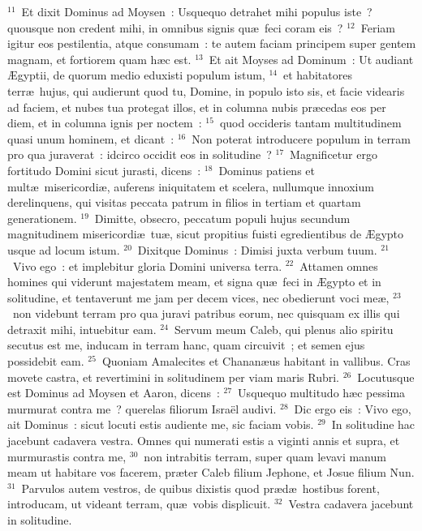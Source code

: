${}^{11}$~Et dixit Dominus ad Moysen~: Usquequo detrahet mihi populus iste~? quousque non credent mihi, in omnibus signis qu\ae\ feci coram eis~?
${}^{12}$~Feriam igitur eos pestilentia, atque consumam~: te autem faciam principem super gentem magnam, et fortiorem quam h\ae c est.
${}^{13}$~Et ait Moyses ad Dominum~: Ut audiant \AE gyptii, de quorum medio eduxisti populum istum,
${}^{14}$~et habitatores terr\ae\ hujus, qui audierunt quod tu, Domine, in populo isto sis, et facie videaris ad faciem, et nubes tua protegat illos, et in columna nubis pr\ae cedas eos per diem, et in columna ignis per noctem~:
${}^{15}$~quod occideris tantam multitudinem quasi unum hominem, et dicant~:
${}^{16}$~Non poterat introducere populum in terram pro qua juraverat~: idcirco occidit eos in solitudine~?
${}^{17}$~Magnificetur ergo fortitudo Domini sicut jurasti, dicens~:
${}^{18}$~Dominus patiens et mult\ae\ misericordi\ae , auferens iniquitatem et scelera, nullumque innoxium derelinquens, qui visitas peccata patrum in filios in tertiam et quartam generationem.
${}^{19}$~Dimitte, obsecro, peccatum populi hujus secundum magnitudinem misericordi\ae\ tu\ae , sicut propitius fuisti egredientibus de \AE gypto usque ad locum istum.
${}^{20}$~Dixitque Dominus~: Dimisi juxta verbum tuum.
${}^{21}$~Vivo ego~: et implebitur gloria Domini universa terra.
${}^{22}$~Attamen omnes homines qui viderunt majestatem meam, et signa qu\ae\ feci in \AE gypto et in solitudine, et tentaverunt me jam per decem vices, nec obedierunt voci me\ae ,
${}^{23}$~non videbunt terram pro qua juravi patribus eorum, nec quisquam ex illis qui detraxit mihi, intuebitur eam.
${}^{24}$~Servum meum Caleb, qui plenus alio spiritu secutus est me, inducam in terram hanc, quam circuivit~; et semen ejus possidebit eam.
${}^{25}$~Quoniam Amalecites et Chanan\ae us habitant in vallibus. Cras movete castra, et revertimini in solitudinem per viam maris Rubri.
${}^{26}$~Locutusque est Dominus ad Moysen et Aaron, dicens~:
${}^{27}$~Usquequo multitudo h\ae c pessima murmurat contra me~? querelas filiorum Isra\"el audivi.
${}^{28}$~Dic ergo eis~: Vivo ego, ait Dominus~: sicut locuti estis audiente me, sic faciam vobis.
${}^{29}$~In solitudine hac jacebunt cadavera vestra. Omnes qui numerati estis a viginti annis et supra, et murmurastis contra me,
${}^{30}$~non intrabitis terram, super quam levavi manum meam ut habitare vos facerem, pr\ae ter Caleb filium Jephone, et Josue filium Nun.
${}^{31}$~Parvulos autem vestros, de quibus dixistis quod pr\ae d\ae\ hostibus forent, introducam, ut videant terram, qu\ae\ vobis displicuit.
${}^{32}$~Vestra cadavera jacebunt in solitudine.
